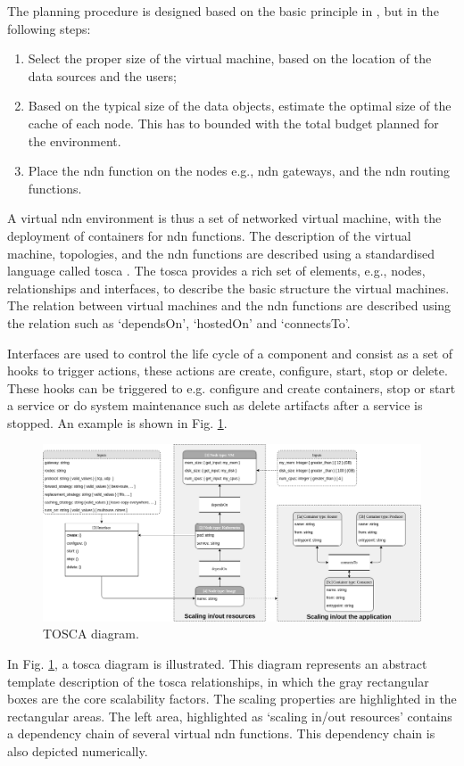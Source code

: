 \documentclass[conference]{IEEEtran}
\begin{document}
The planning procedure is designed based on the basic principle in \cite{mccabe2010network}, but in the following steps:
\begin{enumerate}
    \item Select the proper size of the virtual machine, based on the location of the data sources and the users;
    \item Based on the typical size of the data objects, estimate the optimal size of the cache of each node. This has to bounded with the total budget planned for the environment. 
    \item Place the \gls{ndn} function on the nodes e.g., \gls{ndn} gateways, and the \gls{ndn} routing functions. 
\end{enumerate}

A virtual \gls{ndn} environment is thus a set of networked virtual machine, with the deployment of containers for \gls{ndn} functions. The description of the virtual machine, topologies, and the \gls{ndn} functions are described using a standardised language called \gls{tosca} \cite{tosca-standard}.
The \gls{tosca} provides a rich set of elements, e.g., nodes, relationships and interfaces, to describe the basic structure the virtual machines. The relation between virtual machines and the \gls{ndn} functions are described using the relation such as `dependsOn', `hostedOn' and `connectsTo'. 

Interfaces are used to control the life cycle of a component and consist as a set of hooks to trigger actions, these actions are create, configure, start, stop or delete. These hooks can be triggered to e.g. configure and create containers, stop or start a service or do system maintenance such as delete artifacts after a service is stopped. An example is shown in Fig. \ref{fig:tosca-diagram}.
\begin{figure}[ht]
\centering
\includegraphics[width=\textwidth]{images/tosca-diagram.png}
\caption{TOSCA diagram.}
\label{fig:tosca-diagram}
\end{figure}
In Fig. \ref{fig:tosca-diagram}, a \gls{tosca} diagram is illustrated. This diagram represents an abstract template description of the \gls{tosca} relationships, in which the gray rectangular boxes are the core scalability factors. The scaling properties are highlighted in the rectangular areas. The left area, highlighted as `scaling in/out resources' contains a dependency chain of several virtual \gls{ndn} functions. This dependency chain is also depicted numerically.
\end{document}
